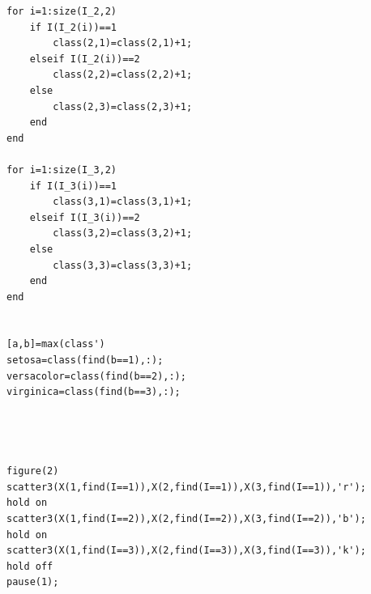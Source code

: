 \documentclass{article}
\begin{document}
\begin{verbatim}
for i=1:size(I_2,2)
    if I(I_2(i))==1
        class(2,1)=class(2,1)+1;
    elseif I(I_2(i))==2
        class(2,2)=class(2,2)+1;
    else
        class(2,3)=class(2,3)+1;
    end
end

for i=1:size(I_3,2)
    if I(I_3(i))==1
        class(3,1)=class(3,1)+1;
    elseif I(I_3(i))==2
        class(3,2)=class(3,2)+1;
    else
        class(3,3)=class(3,3)+1;
    end
end


[a,b]=max(class')
setosa=class(find(b==1),:);
versacolor=class(find(b==2),:);
virginica=class(find(b==3),:);




figure(2)
scatter3(X(1,find(I==1)),X(2,find(I==1)),X(3,find(I==1)),'r');
hold on
scatter3(X(1,find(I==2)),X(2,find(I==2)),X(3,find(I==2)),'b');
hold on
scatter3(X(1,find(I==3)),X(2,find(I==3)),X(3,find(I==3)),'k');
hold off
pause(1);

\end{verbatim}
\pagebreak
\end{document}
